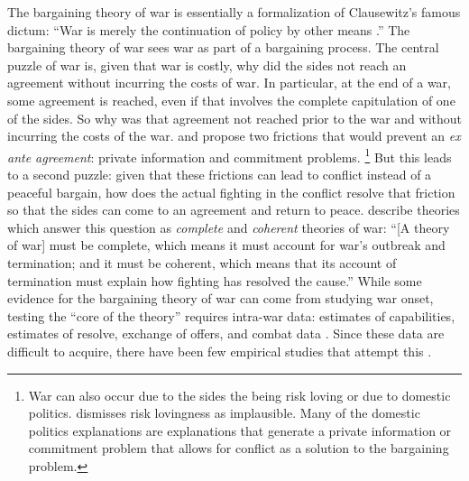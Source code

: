 The bargaining theory of war is essentially a formalization of Clausewitz's famous dictum: ``War is merely the continuation of policy by other means \parencite[87]{Clausewitz1989}.''
The bargaining theory of war sees war as part of a bargaining process.
The central puzzle of war is, given that war is costly, why did the sides not reach an agreement without incurring the costs of war.
In particular, at the end of a war, some agreement is reached, even if that involves the complete capitulation of one of the sides.
So why was that agreement not reached prior to the war and without incurring the costs of the war.
\textcite{Fearon1995} and \textcite{Powell2006} propose two frictions that would prevent an \textit{ex ante agreement}: private information and commitment problems.%
\footnote{
  War can also occur due to the sides the being risk loving or due to domestic politics.
  \textcite{Fearon1995} dismisses risk lovingness as implausible.
  Many of the domestic politics explanations are explanations that generate a private information or commitment problem that allows for conflict as a solution to the bargaining problem.
}
But this leads to a second puzzle: given that these frictions can lead to conflict instead of a peaceful bargain, how does the actual fighting in the conflict resolve that friction so that the sides can come to an agreement and return to peace.
\textcite[757]{LeventogluSlantchev2007} describe theories which answer this question as \textit{complete} and \textit{coherent} theories of war: ``[A theory of war] must be complete, which means it must account for war’s outbreak and termination; and it must be coherent, which means that its account of termination must explain how fighting has resolved the cause.''
While some evidence for the bargaining theory of war can come from studying war onset, testing the ``core of the theory'' requires intra-war data: estimates of capabilities, estimates of resolve, exchange of offers, and combat data \parencite{Reiter2003}.
Since these data are difficult to acquire, there have been few empirical studies that attempt this \parencites{Goemans2000}{Reiter2003}{Ramsay2008}{Reiter2009}.

